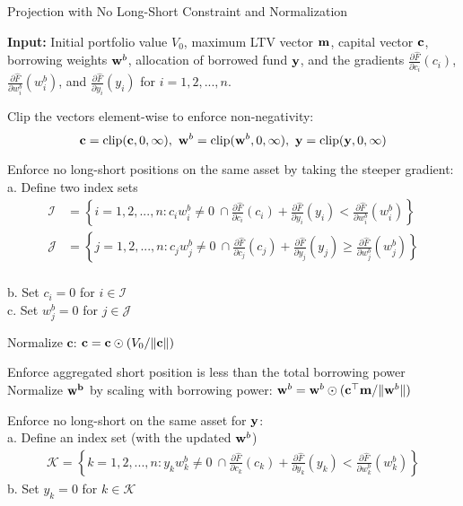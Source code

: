 \documentclass{article} %
\newcommand{\INDSTATE}[1][1]{\hspace{#1\algorithmicindent}}
\theoremstyle{plain}
\theoremstyle{definition} %
\begin{document}
  \begin{algorithm}
    \caption{Projection with No Long-Short Constraint and Normalization}\label{alg:projection}
    \begin{algorithmic}[1]
    \STATE \textbf{Input:} 
    Initial portfolio value $V_0$, maximum LTV vector ${\bf m}$,
    capital vector ${\bf c}$, borrowing weights ${\bf w}^b$, allocation of borrowed fund $\bf{y}$,
    and the gradients 
    $\frac{\partial \hat F}{\partial c_i}(c_i)$, $\frac{\partial \hat F}{\partial w^b_i}(w^b_i)$, and 
    $\frac{\partial \hat F}{\partial y_i}(y_i)$ for $i=1,2,...,n$.

    \STATE Clip the vectors element-wise to enforce non-negativity:
    \[
    {\bf c} = \text{clip}({\bf c} , 0, \infty),\ {\bf w}^b = \text{clip}({\bf w}^b, 0, \infty),\ {\bf y} = \text{clip}( {\bf y}, 0, \infty)
    \]
    
    \STATE Enforce no long-short positions on the same asset by taking the steeper gradient:\\
    \INDSTATE a. Define two index sets
    \begin{align*} 
    \mathcal{I} &= \left\{
      i=1,2,...,n: c_i w^b_i\neq 0\ \cap 
    \frac{\partial \hat F}{\partial c_i}(c_i) + \frac{\partial \hat F}{\partial y_i}(y_i) < \frac{\partial \hat F}{\partial w^b_i}(w^b_i)
    \right\}\\
    \mathcal{J} &= \left\{j=1,2,...,n: c_jw^b_j\neq 0\ \cap 
    \frac{\partial \hat F}{\partial c_j}(c_j) + \frac{\partial \hat F}{\partial y_j}(y_j) \geq \frac{\partial \hat F}{\partial w^b_j}(w^b_j)\right\}
  \end{align*}\\
    \INDSTATE b. Set $c_i=0$ for $i \in \mathcal{I}$\\
    \INDSTATE c. Set $w^b_j=0$ for $j \in \mathcal{J}$
    
    \STATE Normalize $\mathbf{c}$: ${\bf c} = {\bf c} \odot (V_0/ \|{\bf c}\|) $
    
    \STATE Enforce aggregated short position is less than the total borrowing power
        \STATE Normalize $\bf w^b$ by scaling with borrowing power:  ${\bf w}^b = {\bf w}^b \odot ({\bf c}^\top {\bf m}/ \|{\bf w}^b\|) $
    \ENDIF
    
    \STATE Enforce no long-short on the same asset for ${\bf y}$:\\
    \INDSTATE a. Define an index set (with the updated ${\bf w}^b$)
    \begin{align*} 
      \mathcal{K} = \left\{
        k=1,2,...,n: y_k w^b_k\neq 0\ \cap 
      \frac{\partial \hat F}{\partial c_k}(c_k) + \frac{\partial \hat F}{\partial y_k}(y_k) < \frac{\partial \hat F}{\partial w^b_k}(w^b_k)
      \right\}
    \end{align*}
    \INDSTATE b. Set $y_k=0$ for $k \in \mathcal{K}$\\
    

\end{algorithmic}
\end{algorithm}
\end{document}
